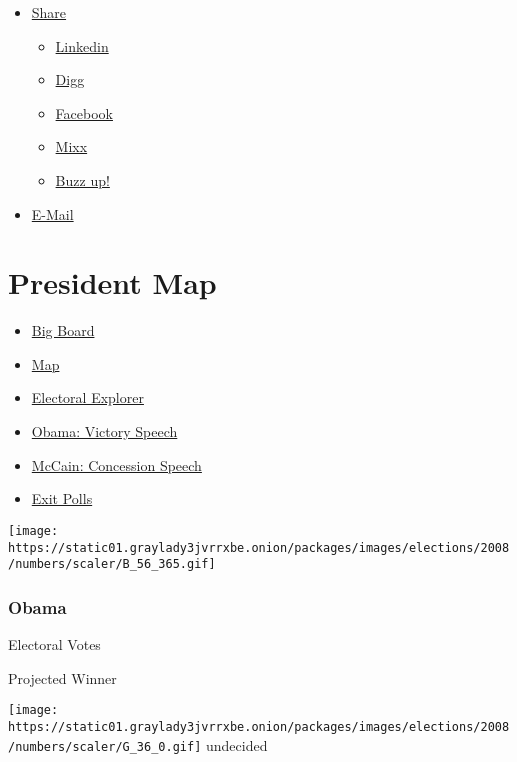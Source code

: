 \begin{itemize}
\tightlist
\item
  \href{//www.nytimes3xbfgragh.onion/gst/mostpopular.html}{Share}

  \begin{itemize}
  \tightlist
  \item
    \href{//www.linkedin.com}{Linkedin}
  \item
    \href{//digg.com/search?section=all\&s=nytimes}{Digg}
  \item
    \href{//www.facebookcorewwwi.onion/nytimes}{Facebook}
  \item
    \href{//www.mixx.com}{Mixx}
  \item
    \href{//buzz.yahoo.com}{Buzz up!}
  \end{itemize}
\item
  \href{//www.nytimes3xbfgragh.onion/gst/mostemailed.html}{E-Mail}
\end{itemize}

\hypertarget{president-map}{%
\section{President Map}\label{president-map}}

\begin{itemize}
\tightlist
\item
  \href{votes.html}{Big Board}
\item
  \href{map.html}{Map}
\item
  \href{explorer.html}{Electoral Explorer}
\item
  \href{speeches/obama-victory-speech.html}{Obama: Victory Speech}
\item
  \href{speeches/mccain-concession-speech.html}{McCain: Concession
  Speech}
\item
  \href{exit-polls.html}{Exit Polls}
\end{itemize}

\texttt{[image: https://static01.graylady3jvrrxbe.onion/packages/images/elections/2008/numbers/scaler/B\_56\_365.gif]}

\hypertarget{obama}{%
\subsubsection{Obama}\label{obama}}

Electoral Votes

Projected Winner

\texttt{[image: https://static01.graylady3jvrrxbe.onion/packages/images/elections/2008/numbers/scaler/G\_36\_0.gif]}
undecided

